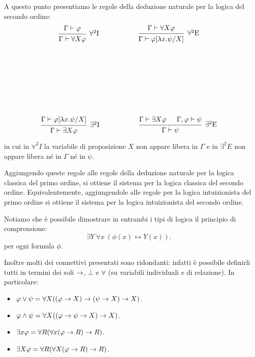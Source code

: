 \documentclass[]{marticle}
\begin{document}
A questo punto presentiamo le regole della deduzione naturale per la
logica del secondo ordine:
\begin{gather*}
    \begin{prooftree}
        \hypo{\Gamma\vdash\phi}
        \infer1[$\forall^2$I]{\Gamma \vdash \forall X\phi}
    \end{prooftree}
    \hspace{2cm}
    \begin{prooftree}
        \hypo{\Gamma \vdash \forall X\phi}
        \infer1[$\forall^2$E]{\Gamma \vdash \phi\sub{\l x.\psi}{X}}
    \end{prooftree} \\ \vspace{3cm} \\
    \begin{prooftree}
        \hypo{\Gamma\vdash\phi\sub{\l x. \psi}{X}}
        \infer1[$\exists^2$I]{\Gamma \vdash \exists X\phi}
    \end{prooftree}
    \hspace{2cm}
    \begin{prooftree}
        \hypo{\Gamma \vdash \exists X\phi}
        \hypo{\Gamma,\phi \vdash \psi}
        \infer2[$\exists^2$E]{\Gamma \vdash \psi}
    \end{prooftree} 
\end{gather*}

in cui in $\forall^2I$ la variabile di proposizione $X$ non appare libera in
$\Gamma$ e in $\exists^2E$ non appare libera n\'e in $\Gamma$ n\'e in $\psi$.

Aggiungendo queste regole alle regole della deduzione naturale per la logica
classica del primo ordine, si ottiene il sistema per la logica classica del
secondo ordine. Equivalentemente, aggiungendole alle regole per la logica
intuizionista del primo ordine si ottiene il sistema per la logica intuizionista
del secondo ordine.

Notiamo che \`e possibile dimostrare in entrambi i tipi di logica il principio
di comprensione:
\[
    \exists Y\ \forall x\ (\phi(x) \leftrightarrow Y(x)).
\]
per ogni formula $\phi$.

Inoltre molti dei connettivi presentati sono ridondanti: infatti \`e possibile
definirli tutti in termini dei soli $\rightarrow$, $\bot$ e $\forall$ (su variabili
individuali e di relazione). In particolare: 
\begin{itemize}
    \item $\varphi \lor \psi = \forall X ((\varphi\rightarrow X)\rightarrow (\psi\rightarrow X) \rightarrow X)$.
    \item $\varphi \land \psi = \forall X ((\varphi\rightarrow\psi\rightarrow X) \rightarrow X)$.
    \item $\exists x \varphi = \forall R (\forall x(\varphi\rightarrow R)\rightarrow R)$.
    \item $\exists X \varphi = \forall R (\forall X(\varphi\rightarrow R)\rightarrow R)$.
\end{itemize}
    
\end{document}
